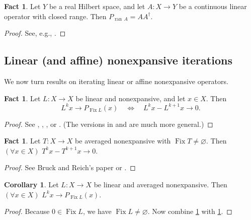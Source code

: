 \documentclass[11pt]{article}
\newcommand{\ran}{\ensuremath{{\operatorname{ran}}\,}}
\newcommand{\Fix}{\ensuremath{\operatorname{Fix}}}
\theoremstyle{definition}
\newtheorem{corollary}[theorem]{Corollary}
\newtheorem{fact}[theorem]{Fact}
\providecommand{\ran}{\operatorname{ran}}
\providecommand{\ran}{\operatorname{ran}}
\begin{document}
{\begin{fact}
\label{f:Pran}
Let $Y$ be a real Hilbert space, and 
let $A\colon X\to Y$ be a continuous linear operator with closed range.
Then 
$P_{\ran A} = AA^\dagger$. 
\end{fact}
\begin{proof}
See, e.g., \cite[Proposition~3.30(ii)]{BC2017}. 
\end{proof}




\subsection{Linear (and affine) nonexpansive iterations}

We now turn results on iterating linear or affine nonexpansive operators.

\begin{fact}
\label{f:convasymp}
Let $L\colon X\to X$ be linear and nonexpansive, 
and let $x\in X$. 
Then 
\begin{equation*}
L^kx \to P_{\Fix L}(x)
\quad\Leftrightarrow\quad
L^kx - L^{k+1}x \to 0. 
\end{equation*}
\end{fact}
\begin{proof}
See \cite[Proposition~4]{Baillon},
\cite[Theorem~1.1]{BBR}, 
\cite[Theorem~2.2]{BDHP}, or 
\cite[Proposition~5.28]{BC2017}. 
(The versions in \cite{Baillon} and \cite{BBR} are much more general.)
\end{proof}


\begin{fact}
\label{f:averasymp}
Let $T\colon X\to X$ be averaged nonexpansive with 
$\Fix T\neq\varnothing$. 
Then $(\forall x\in X)$ 
$T^kx-T^{k+1}x\to 0$. 
\end{fact}
\begin{proof}
See Bruck and Reich's paper \cite{BruRei} or \cite[Corollary~5.16(ii)]{BC2017}.
\end{proof}

\begin{corollary}
\label{c:key}
Let $L\colon X\to X$ be linear and averaged nonexpansive.
Then 
$(\forall x\in X)$ $L^kx \to P_{\Fix L}(x)$.
\end{corollary}
\begin{proof}
Because $0\in\Fix L$, we have $\Fix L\neq\varnothing$. 
Now combine
\cref{f:convasymp} with \cref{f:averasymp}.
\end{proof}

}
\end{document}
